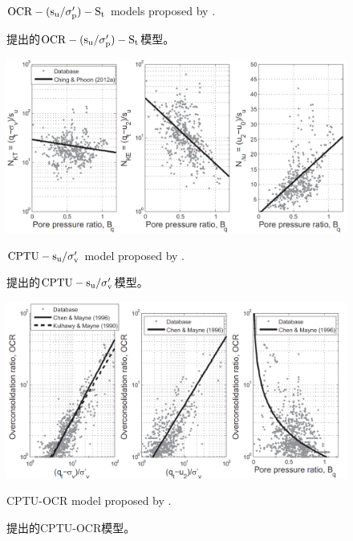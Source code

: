 \begin{figure}[!p]
\begin{minipage}[t]{0.48\textwidth}
        \caption{$\rm{OCR}-(s_u/\sigma_p')-S_t$ models proposed by \citet{Ching2012522}.}
        \vspace{-5pt}
        \addtocounter{figure}{-1}
        \renewcommand{\figurename}{图}
        \caption{\citet{Ching2012522}提出的$\rm{OCR}-(s_u/\sigma_p')-S_t$模型。}
        \renewcommand{\figurename}{Figure}
    \end{minipage}
\end{figure}

\begin{figure}[!p]
    \centering
    \begin{minipage}[t]{0.48\textwidth}
        \centering
        \includegraphics[width=\textwidth]{figures/figure-12.png}
        \caption{$\rm{CPTU}-s_u/\sigma_v'$ model proposed by \citet{Ching2012522}.}
        \vspace{-5pt}
        \addtocounter{figure}{-1}
        \renewcommand{\figurename}{图}
        \caption{\citet{Ching2012522}提出的$\rm{CPTU}-s_u/\sigma_v'$模型。}
        \renewcommand{\figurename}{Figure}
    \end{minipage}
    \begin{minipage}[t]{0.48\textwidth}
        \centering
        \includegraphics[width=\textwidth]{figures/figure-13.png}
        \caption{CPTU-OCR model proposed by \citet{Chen1996488, Kulhawy1990}.}
        \vspace{-5pt}
        \addtocounter{figure}{-1}
        \renewcommand{\figurename}{图}
        \caption{\citet{Chen1996488, Kulhawy1990}提出的CPTU-OCR模型。}
        \renewcommand{\figurename}{Figure}
    \end{minipage}
\end{figure}

